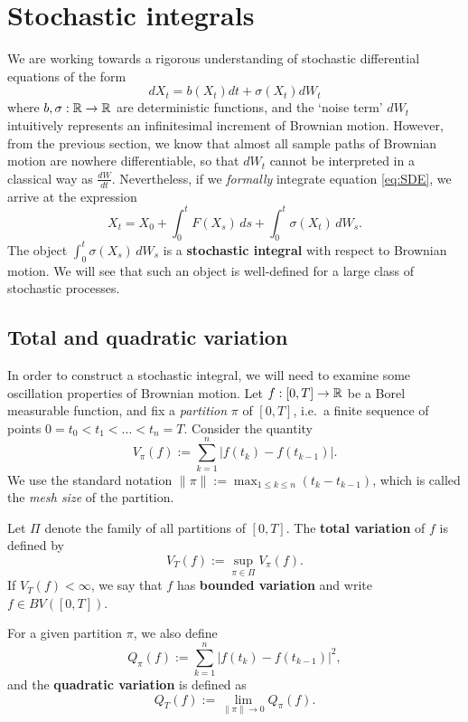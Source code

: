 \section{Stochastic integrals}

We are working towards a rigorous understanding of stochastic differential equations of the form
\begin{equation}
\label{eq:SDE}
    dX_t = b(X_t)dt + \sigma(X_t) dW_t
\end{equation}
where $b, \sigma : \mathbb{R}\to\mathbb{R}$ are deterministic functions, and the `noise term' $dW_t$ intuitively represents an infinitesimal increment of Brownian motion. However, from the previous section, we know that almost all sample paths of Brownian motion are nowhere differentiable, so that $dW_t$ cannot be interpreted in a classical way as $\frac{dW}{dt}$. Nevertheless, if we \emph{formally} integrate equation \eqref{eq:SDE}, we arrive at the expression
\begin{equation}
    X_t = X_0 + \int_0^t F(X_s) \,ds + \int_0^t \sigma(X_t) \,dW_s.
\end{equation}
The object $\int_0^t \sigma(X_s)\,dW_s$ is a \textbf{stochastic integral} with respect to Brownian motion. We will see that such an object is well-defined for a large class of stochastic processes.

\subsection{Total and quadratic variation}

In order to construct a stochastic integral, we will need to examine some oscillation properties of Brownian motion. Let $f : [0, T] \to \mathbb{R}$ be a Borel measurable function, and fix a \emph{partition} $\pi$ of $[0, T]$, i.e.\ a finite sequence of points $0 = t_0 < t_1 < \ldots < t_n = T$. Consider the quantity
\begin{equation*}
    V_\pi(f) := \sum_{k=1}^n |f(t_k) - f(t_{k-1})|.
\end{equation*}
We use the standard notation $\|\pi\| := \max_{1 \le k \le n}(t_k - t_{k-1})$, which is called the \emph{mesh size} of the partition.

\begin{definition}
\label{def:BV}
Let $\Pi$ denote the family of all partitions of $[0, T]$. The \textbf{total variation} of $f$ is defined by
\begin{equation*}
    V_T(f) := \sup_{\pi \in \Pi} V_\pi(f).
\end{equation*}
If $V_T(f) < \infty$, we say that $f$ has \textbf{bounded variation} and write $f \in BV([0,T])$.

For a given partition $\pi$, we also define
\begin{equation*}
    Q_\pi(f) := \sum_{k=1}^n |f(t_k) - f(t_{k-1})|^2,
\end{equation*}
and the \textbf{quadratic variation} is defined as
\begin{equation}
\label{eq:quadvar}
    Q_T(f) := \lim_{\|\pi\|\to 0} Q_\pi(f).
\end{equation}
\end{definition}

